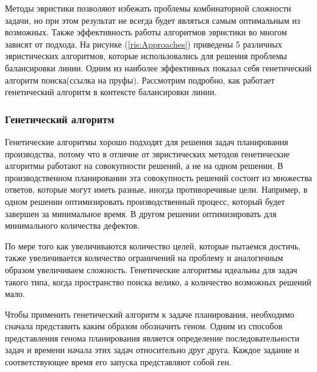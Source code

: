 Методы эвристики позволяют избежать проблемы комбинаторной сложности задачи, но при этом результат не всегда будет являться самым оптимальным из возможных. Также эффективность работы алгоритмов эвристики во многом зависят от подхода. На рисунке (\ref{ris:Approaches}) приведены 5 различных эвристических алгоритмов, которые использовались для решения проблемы балансировки линии. Одним из наиболее эффективных показал себя генетический алгоритм поиска(ссылка на пруфы). Рассмотрим подробно, как работает генетический алгоритм в контексте балансировки линии.

\subsubsection{Генетический алгоритм}

Генетические алгоритмы хорошо подходят для решения задач планирования производства, потому что в отличие от эвристических методов генетические алгоритмы работают на совокупности решений, а не на одном решении. В производственном планировании эта совокупность решений состоит из множества ответов, которые могут иметь разные, иногда противоречивые цели. Например, в одном решении оптимизировать производственный процесс, который будет завершен за минимальное время. В другом решении оптимизировать для минимального количества дефектов.

По мере того как увеличиваются количество целей, которые пытаемся достичь, также увеличивается количество ограничений на проблему и аналогичным образом увеличиваем сложность. Генетические алгоритмы идеальны для задач такого типа, когда пространство поиска велико, а количество возможных решений мало.

Чтобы применить генетический алгоритм к задаче планирования, необходимо сначала представить каким образом обозначить геном. Одним из способов представления генома планирования является определение последовательности задач и времени начала этих задач относительно друг друга. Каждое задание и соответствующее время его запуска представляют собой ген.

